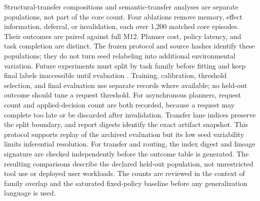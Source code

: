 Structural-transfer compositions and semantic-transfer analyses are separate populations, not part of the core count. Four ablations remove memory, effect information, deferral, or invalidation, each over 1,200 matched core episodes. Their outcomes are paired against full M12. Planner cost, policy latency, and task completion are distinct. The frozen protocol and source hashes identify these populations; they do not turn seed relabeling into additional environmental variation. Future experiments must split by task family before fitting and keep final labels inaccessible until evaluation \cite{efron1993,demsar2006,nadeau2003,toolsandbox,swebench,taubench}. Training, calibration, threshold selection, and final evaluation use separate records where available; no held-out outcome should tune a request threshold. For asynchronous planners, request count and applied-decision count are both recorded, because a request may complete too late or be discarded after invalidation. Transfer lane indices preserve the split boundary, and report digests identify the exact artifact snapshot. This protocol supports replay of the archived evaluation but its low seed variability limits inferential resolution. For transfer and routing, the index digest and lineage signature are checked independently before the outcome table is generated. The resulting comparisons describe the declared held-out population, not unrestricted tool use or deployed user workloads. The counts are reviewed in the context of family overlap and the saturated fixed-policy baseline before any generalization language is used.
